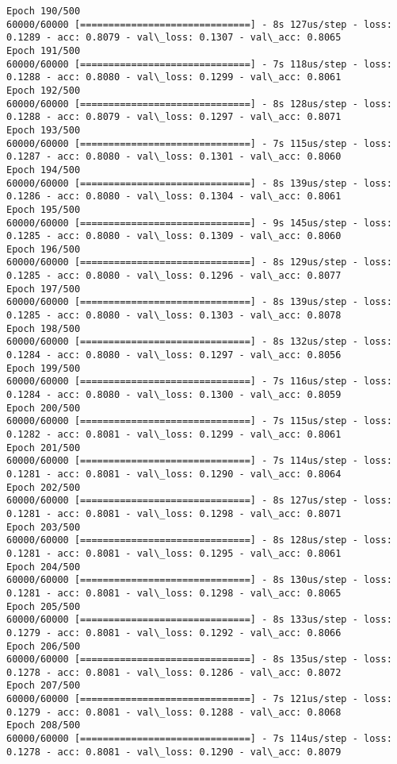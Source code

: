 \documentclass[11pt]{article}
\begin{document}
\begin{Verbatim}[commandchars=\\\{\}]
Epoch 190/500
60000/60000 [==============================] - 8s 127us/step - loss: 0.1289 - acc: 0.8079 - val\_loss: 0.1307 - val\_acc: 0.8065
Epoch 191/500
60000/60000 [==============================] - 7s 118us/step - loss: 0.1288 - acc: 0.8080 - val\_loss: 0.1299 - val\_acc: 0.8061
Epoch 192/500
60000/60000 [==============================] - 8s 128us/step - loss: 0.1288 - acc: 0.8079 - val\_loss: 0.1297 - val\_acc: 0.8071
Epoch 193/500
60000/60000 [==============================] - 7s 115us/step - loss: 0.1287 - acc: 0.8080 - val\_loss: 0.1301 - val\_acc: 0.8060
Epoch 194/500
60000/60000 [==============================] - 8s 139us/step - loss: 0.1286 - acc: 0.8080 - val\_loss: 0.1304 - val\_acc: 0.8061
Epoch 195/500
60000/60000 [==============================] - 9s 145us/step - loss: 0.1285 - acc: 0.8080 - val\_loss: 0.1309 - val\_acc: 0.8060
Epoch 196/500
60000/60000 [==============================] - 8s 129us/step - loss: 0.1285 - acc: 0.8080 - val\_loss: 0.1296 - val\_acc: 0.8077
Epoch 197/500
60000/60000 [==============================] - 8s 139us/step - loss: 0.1285 - acc: 0.8080 - val\_loss: 0.1303 - val\_acc: 0.8078
Epoch 198/500
60000/60000 [==============================] - 8s 132us/step - loss: 0.1284 - acc: 0.8080 - val\_loss: 0.1297 - val\_acc: 0.8056
Epoch 199/500
60000/60000 [==============================] - 7s 116us/step - loss: 0.1284 - acc: 0.8080 - val\_loss: 0.1300 - val\_acc: 0.8059
Epoch 200/500
60000/60000 [==============================] - 7s 115us/step - loss: 0.1282 - acc: 0.8081 - val\_loss: 0.1299 - val\_acc: 0.8061
Epoch 201/500
60000/60000 [==============================] - 7s 114us/step - loss: 0.1281 - acc: 0.8081 - val\_loss: 0.1290 - val\_acc: 0.8064
Epoch 202/500
60000/60000 [==============================] - 8s 127us/step - loss: 0.1281 - acc: 0.8081 - val\_loss: 0.1298 - val\_acc: 0.8071
Epoch 203/500
60000/60000 [==============================] - 8s 128us/step - loss: 0.1281 - acc: 0.8081 - val\_loss: 0.1295 - val\_acc: 0.8061
Epoch 204/500
60000/60000 [==============================] - 8s 130us/step - loss: 0.1281 - acc: 0.8081 - val\_loss: 0.1298 - val\_acc: 0.8065
Epoch 205/500
60000/60000 [==============================] - 8s 133us/step - loss: 0.1279 - acc: 0.8081 - val\_loss: 0.1292 - val\_acc: 0.8066
Epoch 206/500
60000/60000 [==============================] - 8s 135us/step - loss: 0.1278 - acc: 0.8081 - val\_loss: 0.1286 - val\_acc: 0.8072
Epoch 207/500
60000/60000 [==============================] - 7s 121us/step - loss: 0.1279 - acc: 0.8081 - val\_loss: 0.1288 - val\_acc: 0.8068
Epoch 208/500
60000/60000 [==============================] - 7s 114us/step - loss: 0.1278 - acc: 0.8081 - val\_loss: 0.1290 - val\_acc: 0.8079

\end{Verbatim}
\end{document}
